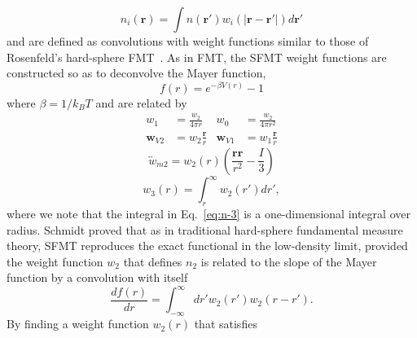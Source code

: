 \documentclass[letterpaper,twocolumn,amsmath,amssymb,prb]{revtex4-1}
\begin{document}
\begin{equation}
  n_{i}(\textbf{r}) = \int
  n(\textbf{r}')w_i(|\textbf{r}-\textbf{r}'|) d\textbf{r}'
  \label{eq:n-convolution}
\end{equation}
and are defined as convolutions with weight 
functions similar to those of 
Rosenfeld's hard-sphere FMT~\cite{rosenfeld1989}. 
As in FMT,
the SFMT weight
functions are constructed so as to deconvolve the Mayer function,
\begin{equation}
  f(r) = e^{-\beta V(r)} - 1
  \label{eq:Mayerfunction}
\end{equation}
where $\beta = 1/k_BT$ %
and are related by
\begin{align}
  w_1 &= \frac{w_2}{4\pi r} &
  w_0 &= \frac{w_2}{4\pi r^2}
  \label{eq:n-0-1}
  \\
  \mathbf{w}_{V2} &= w_2\frac{\textbf{r}}{r} &
  \mathbf{w}_{V1} &= w_1\frac{\textbf{r}}{r}
  \label{eq:n-vectors}
\end{align}
\begin{equation}
  \overleftrightarrow{w}_{m2} = w_2(r)\left(\frac{\mathbf{rr}}{r^2}-\frac{I}{3}\right)
  \label{eq:n-tensor}
\end{equation}
\begin{equation}
   w_3(r) = \int_{r}^{\infty} w_2(r') dr',
  \label{eq:n-3}
\end{equation}
where we note that the integral in Eq.~\ref{eq:n-3} is a
one-dimensional integral over radius. Schmidt proved that as in traditional 
hard-sphere fundamental measure theory, 
SFMT reproduces the exact functional in the low-density limit, provided the 
weight function $w_2$ that defines $n_2$ is related to the slope of the Mayer 
function by a convolution with itself
\begin{equation}\label{eq:mayerandw2}
  \frac{d f(r)}{dr} = \int_{-\infty}^{\infty} dr' w_2(r') w_2 (r-r').
\end{equation}
By finding a weight function $w_2(r)$ that satisfies 
\end{document}
